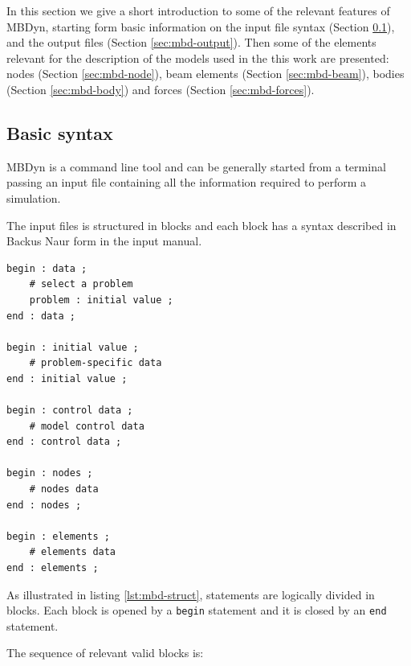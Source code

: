 In this section we give a short introduction to some of the relevant features of MBDyn, starting form basic information on the input file syntax (Section \ref{sec:mbd-syntax}), and the output files (Section \ref{sec:mbd-output}). Then some of the elements relevant for the description of the models used in the this work are presented: nodes (Section \ref{sec:mbd-node}), beam elements (Section \ref{sec:mbd-beam}), bodies (Section \ref{sec:mbd-body}) and forces (Section \ref{sec:mbd-forces}). 


\subsection{Basic syntax}
\label{sec:mbd-syntax}

MBDyn is a command line tool and can be generally started from a terminal passing an input file containing all the information required to perform a simulation. 

The input files is structured in blocks and each block has a syntax described in Backus Naur form in the input manual.

\lstset{language=mbdyn}
\begin{lstlisting}[caption=MBDyn input file structure,label=lst:mbd-struct]
begin : data ;
    # select a problem
    problem : initial value ;
end : data ;

begin : initial value ;
    # problem-specific data
end : initial value ;

begin : control data ;
    # model control data
end : control data ;

begin : nodes ;
    # nodes data
end : nodes ;

begin : elements ;
    # elements data
end : elements ;
\end{lstlisting}

As illustrated in listing \ref{lst:mbd-struct}, statements are logically divided in blocks. Each block is opened by a \texttt{begin} statement and it is closed by an \texttt{end} statement.

The sequence of relevant valid blocks is:

